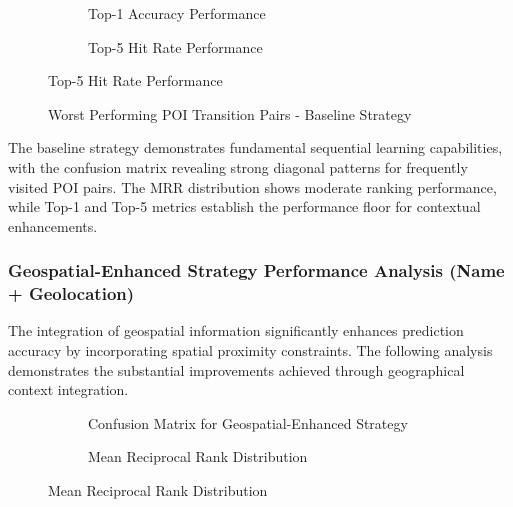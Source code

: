 \documentclass[12pt,a4paper]{article}
\begin{document}
\begin{figure}[h]
\centering
\begin{subfigure}{0.48\textwidth}
\centering
\caption{Top-1 Accuracy Performance}
\label{fig:baseline_top1}
\end{subfigure}
\hfill
\begin{subfigure}{0.48\textwidth}
\centering
\caption{Top-5 Hit Rate Performance}
\label{fig:baseline_top5}
\end{subfigure}
\end{figure}

\begin{figure}[h]
\centering
\caption{Worst Performing POI Transition Pairs - Baseline Strategy}
\label{fig:baseline_worst_pairs}
\end{figure}

The baseline strategy demonstrates fundamental sequential learning capabilities, with the confusion matrix revealing strong diagonal patterns for frequently visited POI pairs. The MRR distribution shows moderate ranking performance, while Top-1 and Top-5 metrics establish the performance floor for contextual enhancements.

\subsubsection{Geospatial-Enhanced Strategy Performance Analysis (Name + Geolocation)}

The integration of geospatial information significantly enhances prediction accuracy by incorporating spatial proximity constraints. The following analysis demonstrates the substantial improvements achieved through geographical context integration.

\begin{figure}[h]
\centering
\begin{subfigure}{0.48\textwidth}
\centering
\caption{Confusion Matrix for Geospatial-Enhanced Strategy}
\label{fig:geospatial_confusion}
\end{subfigure}
\hfill
\begin{subfigure}{0.48\textwidth}
\centering
\caption{Mean Reciprocal Rank Distribution}
\label{fig:geospatial_mrr}
\end{subfigure}
\end{figure}
\end{document}
